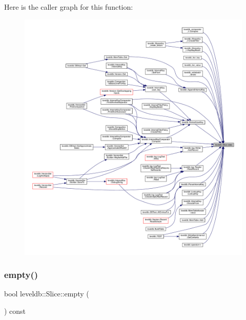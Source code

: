 Here is the caller graph for this function\+:
\nopagebreak
\begin{figure}[H]
\begin{center}
\leavevmode
\includegraphics[width=350pt]{classleveldb_1_1_slice_a94ccee3d05b66ba0b059f2d9772b782b_icgraph}
\end{center}
\end{figure}
\mbox{\label{classleveldb_1_1_slice_a56ac7a70125c26187ecf4dd040004582}} 
\subsubsection{\texorpdfstring{empty()}{empty()}}
{\footnotesize\ttfamily bool leveldb\+::\+Slice\+::empty (\begin{DoxyParamCaption}{ }\end{DoxyParamCaption}) const\hspace{0.3cm}{\ttfamily [inline]}}


